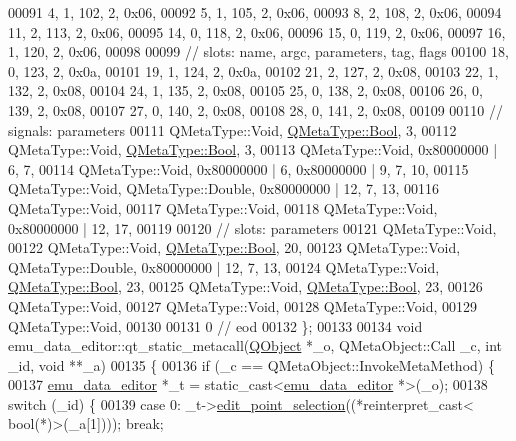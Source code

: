 \begin{DoxyCode}
00091        4,    1,  102,    2, 0x06,
00092        5,    1,  105,    2, 0x06,
00093        8,    2,  108,    2, 0x06,
00094       11,    2,  113,    2, 0x06,
00095       14,    0,  118,    2, 0x06,
00096       15,    0,  119,    2, 0x06,
00097       16,    1,  120,    2, 0x06,
00098 
00099  \textcolor{comment}{// slots: name, argc, parameters, tag, flags}
00100       18,    0,  123,    2, 0x0a,
00101       19,    1,  124,    2, 0x0a,
00102       21,    2,  127,    2, 0x08,
00103       22,    1,  132,    2, 0x08,
00104       24,    1,  135,    2, 0x08,
00105       25,    0,  138,    2, 0x08,
00106       26,    0,  139,    2, 0x08,
00107       27,    0,  140,    2, 0x08,
00108       28,    0,  141,    2, 0x08,
00109 
00110  \textcolor{comment}{// signals: parameters}
00111     QMetaType::Void, \hyperlink{a00004_a76a8b016e5ad61faf9062cc387df5016}{QMetaType::Bool},    3,
00112     QMetaType::Void, \hyperlink{a00004_a76a8b016e5ad61faf9062cc387df5016}{QMetaType::Bool},    3,
00113     QMetaType::Void, 0x80000000 | 6,    7,
00114     QMetaType::Void, 0x80000000 | 6, 0x80000000 | 9,    7,   10,
00115     QMetaType::Void, QMetaType::Double, 0x80000000 | 12,    7,   13,
00116     QMetaType::Void,
00117     QMetaType::Void,
00118     QMetaType::Void, 0x80000000 | 12,   17,
00119 
00120  \textcolor{comment}{// slots: parameters}
00121     QMetaType::Void,
00122     QMetaType::Void, \hyperlink{a00004_a76a8b016e5ad61faf9062cc387df5016}{QMetaType::Bool},   20,
00123     QMetaType::Void, QMetaType::Double, 0x80000000 | 12,    7,   13,
00124     QMetaType::Void, \hyperlink{a00004_a76a8b016e5ad61faf9062cc387df5016}{QMetaType::Bool},   23,
00125     QMetaType::Void, \hyperlink{a00004_a76a8b016e5ad61faf9062cc387df5016}{QMetaType::Bool},   23,
00126     QMetaType::Void,
00127     QMetaType::Void,
00128     QMetaType::Void,
00129     QMetaType::Void,
00130 
00131        0        \textcolor{comment}{// eod}
00132 \};
00133 
00134 \textcolor{keywordtype}{void} emu\_data\_editor::qt\_static\_metacall(\hyperlink{a00059}{QObject} *\_o, QMetaObject::Call \_c, \textcolor{keywordtype}{int} \_id, \textcolor{keywordtype}{void} **\_a)
00135 \{
00136     \textcolor{keywordflow}{if} (\_c == QMetaObject::InvokeMetaMethod) \{
00137         \hyperlink{a00008}{emu\_data\_editor} *\_t = \textcolor{keyword}{static\_cast<}\hyperlink{a00008}{emu\_data\_editor} *\textcolor{keyword}{>}(\_o);
00138         \textcolor{keywordflow}{switch} (\_id) \{
00139         \textcolor{keywordflow}{case} 0: \_t->\hyperlink{a00008_a9aa2af0c329358fd96f7fb6b7f02bfe1}{edit\_point\_selection}((*\textcolor{keyword}{reinterpret\_cast<} \textcolor{keywordtype}{bool}(*)\textcolor{keyword}{>}(\_a[1]))); \textcolor{keywordflow}{break};

\end{DoxyCode}
